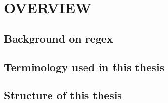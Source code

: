 \chapter{OVERVIEW}

\section{Background on regex}

\section{Terminology used in this thesis}

\section{Structure of this thesis}
